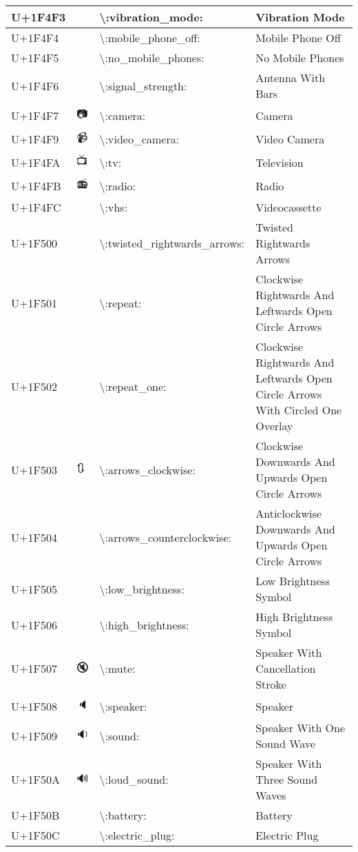\begin{table}[h]
\begin{tabulary}{\linewidth}{|L|L|L|L|}
\hline
U+1F4F3 & 📳 & {\textbackslash}:vibration\_mode: & Vibration Mode \\
\hline
U+1F4F4 & 📴 & {\textbackslash}:mobile\_phone\_off: & Mobile Phone Off \\
\hline
U+1F4F5 & 📵 & {\textbackslash}:no\_mobile\_phones: & No Mobile Phones \\
\hline
U+1F4F6 & 📶 & {\textbackslash}:signal\_strength: & Antenna With Bars \\
\hline
U+1F4F7 & 📷 & {\textbackslash}:camera: & Camera \\
\hline
U+1F4F9 & 📹 & {\textbackslash}:video\_camera: & Video Camera \\
\hline
U+1F4FA & 📺 & {\textbackslash}:tv: & Television \\
\hline
U+1F4FB & 📻 & {\textbackslash}:radio: & Radio \\
\hline
U+1F4FC & 📼 & {\textbackslash}:vhs: & Videocassette \\
\hline
U+1F500 & 🔀 & {\textbackslash}:twisted\_rightwards\_arrows: & Twisted Rightwards Arrows \\
\hline
U+1F501 & 🔁 & {\textbackslash}:repeat: & Clockwise Rightwards And Leftwards Open Circle Arrows \\
\hline
U+1F502 & 🔂 & {\textbackslash}:repeat\_one: & Clockwise Rightwards And Leftwards Open Circle Arrows With Circled One Overlay \\
\hline
U+1F503 & 🔃 & {\textbackslash}:arrows\_clockwise: & Clockwise Downwards And Upwards Open Circle Arrows \\
\hline
U+1F504 & 🔄 & {\textbackslash}:arrows\_counterclockwise: & Anticlockwise Downwards And Upwards Open Circle Arrows \\
\hline
U+1F505 & 🔅 & {\textbackslash}:low\_brightness: & Low Brightness Symbol \\
\hline
U+1F506 & 🔆 & {\textbackslash}:high\_brightness: & High Brightness Symbol \\
\hline
U+1F507 & 🔇 & {\textbackslash}:mute: & Speaker With Cancellation Stroke \\
\hline
U+1F508 & 🔈 & {\textbackslash}:speaker: & Speaker \\
\hline
U+1F509 & 🔉 & {\textbackslash}:sound: & Speaker With One Sound Wave \\
\hline
U+1F50A & 🔊 & {\textbackslash}:loud\_sound: & Speaker With Three Sound Waves \\
\hline
U+1F50B & 🔋 & {\textbackslash}:battery: & Battery \\
\hline
U+1F50C & 🔌 & {\textbackslash}:electric\_plug: & Electric Plug \\

\end{tabulary}
\end{table}
